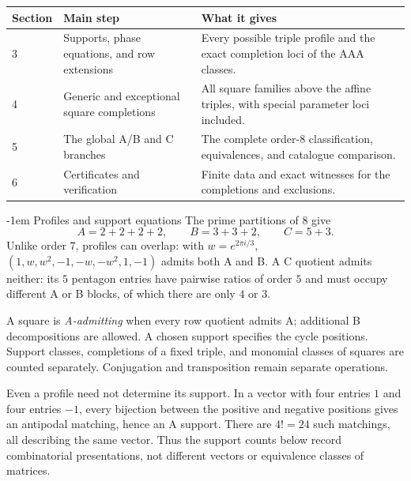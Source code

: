 \documentclass[11pt,a4paper]{article}
\makeatletter
\theoremstyle{plain}
\theoremstyle{definition}
\numberwithin{equation}{section}
\renewcommand\subsection{\@startsection{subsection}{2}{\z@}  {\medskipamount}  {-1em}  {\normalfont\normalsize\bfseries}}
\makeatother
\begin{document}
\begin{center}\small
\begin{tabular}{@{}p{}>{\raggedright\arraybackslash}p{}>{\raggedright\arraybackslash}p{}@{}}\toprule
Section&Main step&What it gives\\\midrule
3&Supports, phase equations, and row extensions&Every possible triple profile and the exact completion loci of the AAA classes.\\
4&Generic and exceptional square completions&All square families above the affine triples, with special parameter loci included.\\
5&The global A/B and C branches&The complete order-$8$ classification, equivalences, and catalogue comparison.\\
6&Certificates and verification&Finite data and exact witnesses for the completions and exclusions.\\
\bottomrule\end{tabular}
\end{center}
\subsection{Profiles and support equations}\label{sec:definitions}\label{sec:census}
The prime partitions of $8$ give
$$\boxed{A=2+2+2+2,\qquad B=3+3+2,\qquad C=5+3.}$$
Unlike order $7$, profiles can overlap: with $w=e^{2\pi i/3}$, $(1,w,w^2,-1,-w,-w^2,1,-1)$ admits both A and B. A C quotient admits neither: its $5$ pentagon entries have pairwise ratios of order $5$ and must occupy different A or B blocks, of which there are only $4$ or $3$.

A square is \emph{A-admitting} when every row quotient admits A; additional B decompositions are allowed. A chosen support specifies the cycle positions. Support classes, completions of a fixed triple, and monomial classes of squares are counted separately. Conjugation and transposition remain separate operations.

Even a profile need not determine its support. In a vector with four entries $1$ and four entries $-1$, every bijection between the positive and negative positions gives an antipodal matching, hence an A support. There are $4!=24$ such matchings, all describing the same vector. Thus the support counts below record combinatorial presentations, not different vectors or equivalence classes of matrices.
\end{document}
